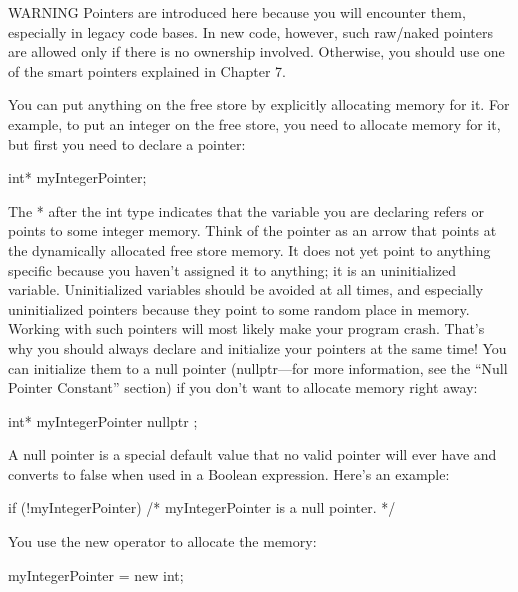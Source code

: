 \begin{myWarning}{WARNING}
Pointers are introduced here because you will encounter them, especially in legacy code bases. In new code, however, such raw/naked pointers are allowed only if there is no ownership involved. Otherwise, you should use one of the smart pointers explained in Chapter 7.
\end{myWarning}


You can put anything on the free store by explicitly allocating memory for it. For example, to put an integer on the free store, you need to allocate memory for it, but first you need to declare a pointer:

\begin{cpp}
int* myIntegerPointer;
\end{cpp}

The * after the int type indicates that the variable you are declaring refers or points to some integer memory. Think of the pointer as an arrow that points at the dynamically allocated free store memory. It does not yet point to anything specific because you haven’t assigned it to anything; it is an uninitialized variable. Uninitialized variables should be avoided at all times, and especially uninitialized pointers because they point to some random place in memory. Working with such pointers will most likely make your program crash. That’s why you should always declare and initialize your pointers at the same time! You can initialize them to a null pointer (nullptr—for more information, see the “Null Pointer Constant” section) if you don’t want to allocate memory right away:

\begin{cpp}
int* myIntegerPointer { nullptr };
\end{cpp}

A null pointer is a special default value that no valid pointer will ever have and converts to false when used in a Boolean expression. Here’s an example:

\begin{cpp}
if (!myIntegerPointer) { /* myIntegerPointer is a null pointer. */ }
\end{cpp}

You use the new operator to allocate the memory:

\begin{cpp}
myIntegerPointer = new int;
\end{cpp}

